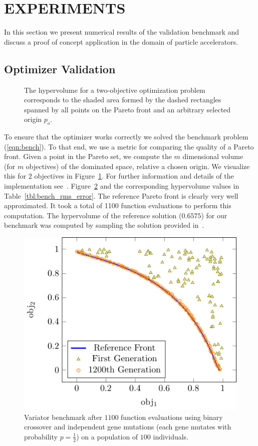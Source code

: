 \section{EXPERIMENTS} \label{sec:experiments}

In this section we present numerical results of the validation benchmark and
  discuss a proof of concept application in the domain of particle
  accelerators.

\subsection{Optimizer Validation}

\begin{figure}
    \centering
    \begin{tikzpicture}[text=black]
      
    \end{tikzpicture}
  \caption{The hypervolume for a two-objective optimization problem
  corresponds to the shaded area formed by the dashed rectangles spanned by
  all points on the Pareto front and an arbitrary selected origin $p_o$.}
  \label{fig:hypervolume}
\end{figure}

To ensure that the optimizer works correctly we solved the benchmark
  problem (\ref{eqn:bench}).
To that end, we use a metric for comparing the quality of a Pareto
  front.
Given a point in the Pareto set, we compute the $m$ dimensional volume (for
  $m$ objectives) of the dominated space, relative a chosen origin.
We visualize this for $2$ objectives in Figure~\ref{fig:hypervolume}.
For further information and details of the implementation see~\cite{whbb:12}.
Figure~\ref{fig:pisa_bench} and the corresponding hypervolume values in
  Table~\ref{tbl:bench_rms_error}.
The reference Pareto front is clearly very well approximated.
It took a total of 1100 function evaluations to perform this computation.
The hypervolume of the reference solution ($0.6575$) for our benchmark was
  computed by sampling the solution provided in~\cite{hbwh:05}.

\begin{figure}
  \centering
    \includegraphics[width=0.7\linewidth]{figures/valid_front}
  \caption{Variator benchmark after $1100$ function evaluations using binary
           crossover and independent gene mutations (each gene mutates with
           probability $p=\frac{1}{2}$) on a population of $100$
           individuals.}
  \label{fig:pisa_bench}
\end{figure}

